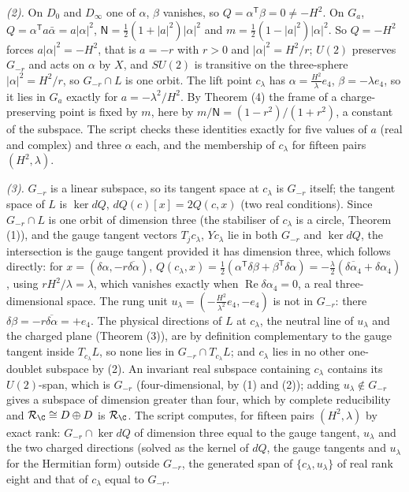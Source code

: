 \emph{(2).} On $D_{0}$ and $D_{\infty}$ one of $\alpha$, $\beta$ vanishes, so $Q = \alpha^{\mathsf T}\beta = 0 \neq -H^{2}$. On $G_{a}$, $Q = \alpha^{\mathsf T}a\bar{\alpha} = a|\alpha|^{2}$, $\mathsf{N} = \tfrac12(1 + |a|^{2})|\alpha|^{2}$ and $m = \tfrac12(1 - |a|^{2})|\alpha|^{2}$. So $Q = -H^{2}$ forces $a|\alpha|^{2} = -H^{2}$, that is $a = -r$ with $r > 0$ and $|\alpha|^{2} = H^{2}/r$; $U(2)$ preserves $G_{-r}$ and acts on $\alpha$ by $X$, and $SU(2)$ is transitive on the three-sphere $|\alpha|^{2} = H^{2}/r$, so $G_{-r} \cap L$ is one orbit. The lift point $c_{\lambda}$ has $\alpha = \tfrac{H^{2}}{\lambda}e_{4}$, $\beta = -\lambda e_{4}$, so it lies in $G_{a}$ exactly for $a = -\lambda^{2}/H^{2}$. By Theorem (4) the frame of a charge-preserving point is fixed by $m$, here by $m/\mathsf{N} = (1 - r^{2})/(1 + r^{2})$, a constant of the subspace. The script checks these identities exactly for five values of $a$ (real and complex) and three $\alpha$ each, and the membership of $c_{\lambda}$ for fifteen pairs $(H^{2}, \lambda)$.

\emph{(3).} $G_{-r}$ is a linear subspace, so its tangent space at $c_{\lambda}$ is $G_{-r}$ itself; the tangent space of $L$ is $\ker dQ$, $dQ(c)[x] = 2Q(c, x)$ (two real conditions). Since $G_{-r} \cap L$ is one orbit of dimension three (the stabiliser of $c_{\lambda}$ is a circle, Theorem (1)), and the gauge tangent vectors $T_{j}c_{\lambda}$, $Yc_{\lambda}$ lie in both $G_{-r}$ and $\ker dQ$, the intersection is the gauge tangent provided it has dimension three, which follows directly: for $x = (\delta\alpha, -r\overline{\delta\alpha})$, $Q(c_{\lambda}, x) = \tfrac12(\alpha^{\mathsf T}\delta\beta + \beta^{\mathsf T}\delta\alpha) = -\tfrac{\lambda}{2}(\overline{\delta\alpha_{4}} + \delta\alpha_{4})$, using $rH^{2}/\lambda = \lambda$, which vanishes exactly when $\operatorname{Re}\delta\alpha_{4} = 0$, a real three-dimensional space. The rung unit $u_{\lambda} = (-\tfrac{H^{2}}{\lambda^{2}}e_{4}, -e_{4})$ is not in $G_{-r}$: there $\delta\beta = -r\overline{\delta\alpha} = +e_{4}$. The physical directions of $L$ at $c_{\lambda}$, the neutral line of $u_{\lambda}$ and the charged plane (Theorem (3)), are by definition complementary to the gauge tangent inside $T_{c_{\lambda}}L$, so none lies in $G_{-r} \cap T_{c_{\lambda}}L$; and $c_{\lambda}$ lies in no other one-doublet subspace by (2). An invariant real subspace containing $c_{\lambda}$ contains its $U(2)$-span, which is $G_{-r}$ (four-dimensional, by (1) and (2)); adding $u_{\lambda} \notin G_{-r}$ gives a subspace of dimension greater than four, which by complete reducibility and $\mathcal{R}_{\C} \cong D \oplus D$ is $\mathcal{R}_{\C}$. The script computes, for fifteen pairs $(H^{2}, \lambda)$ by exact rank: $G_{-r} \cap \ker dQ$ of dimension three equal to the gauge tangent, $u_{\lambda}$ and the two charged directions (solved as the kernel of $dQ$, the gauge tangents and $u_{\lambda}$ for the Hermitian form) outside $G_{-r}$, the generated span of $\{c_{\lambda}, u_{\lambda}\}$ of real rank eight and that of $c_{\lambda}$ equal to $G_{-r}$.

